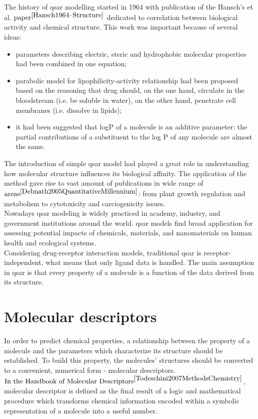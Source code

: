 The history of \acrshort{qsar} modelling started in 1964 with publication of the Hansch's et al. $\text{paper}^{\cite{Hansch1964--Structure}}$ dedicated to correlation between biological activity and chemical structure.
This work was important because of several ideas:
\begin{itemize}

    \item  parameters describing electric, steric and hydrophobic molecular properties had been combined in one equation;
    \item parabolic model for lipophilicity-activity relationship had been proposed based on the reasoning that drug should, on the one hand, circulate in the bloodstream (i.e. be soluble in water), on the other hand, penetrate cell membranes (i.e. dissolve in lipids); 
    \item it had been suggested that logP of a molecule is an additive parameter: the partial contributions of a substituent to the log P of any molecule are almost the same.
\end{itemize}

The introduction of simple \acrshort{qsar} model had played a great role in understanding how molecular structure influences its biological affinity.
The application of the method gave rise to vast amount of publications in wide range of $\text{areas}^{\cite{Debnath2005QuantitativeMillennium}}$: from plant growth regulation and metabolism to cytotoxicity and carciogenicity issues.\\

Nowadays \acrshort{qsar} modeling is widely practiced in academy, industry, and government institutions around the world.
\acrshort{qsar} models find broad application for assessing potential impacts of chemicals, materials, and nanomaterials on human health and ecological systems.\\

Considering drug-receptor interaction models, traditional \acrshort{qsar} is receptor-independent, what means that only ligand data is handled.
The main assumption in \acrshort{qsar} is that every property of a molecule is a function of the data derived from its structure.
\hfill\break\\
\section{Molecular descriptors}
  In order to predict chemical properties, a relationship between the property of a molecule and the parameters which characterize its structure should be established.
  To build this property, the molecules' structures should be converted to a convenient, numerical form - molecular descriptors.
  $\text{In the Handbook of Molecular Descriptors}^{\cite{Todeschini2007MethodsChemistry}}$,
  molecular descriptor is defined as the final result of a logic and mathematical procedure which transforms chemical information encoded within a symbolic representation of a molecule into a useful number. \\

